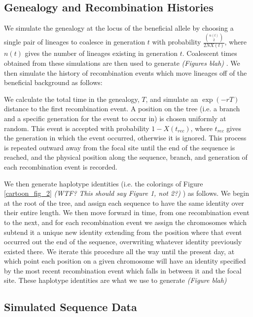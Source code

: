 \documentclass[a4paper,10pt]{article}
\newcommand{\jb}[1]{{\it\color{blue} (#1)} }
\begin{document}
\subsection*{Genealogy and Recombination Histories}

We simulate the genealogy at the locus of the beneficial allele by choosing a single pair of lineages to coalesce in generation $t$ with probability $\frac{{n\left(t\right) \choose 2}}{2NX\left(t\right)}$, where $n\left(t\right)$ gives the number of lineages existing in generation $t$. Coalescent times obtained from these simulations are then used to generate \jb{Figures blah}. We then simulate the history of recombination events which move lineages off of the beneficial background as follows:

We calculate the total time in the genealogy, $T$, and simulate an $\exp\left(-rT\right)$ distance to the first recombination event. A position on the tree (i.e. a branch and a specific generation for the event to occur in) is chosen uniformly at random. This event is accepted with probability $1-X\left(t_{rec}\right)$, where $t_{rec}$ gives the generation in which the event occurred, otherwise it is ignored. This process is repeated outward away from the focal site until the end of the sequence is reached, and the physical position along the sequence, branch, and generation of each recombination event is recorded.

We then generate haplotype identities (i.e. the colorings of Figure \ref{cartoon_fig_2} \jb{WTF? This should say Figure 1, not 2?}) as follows. We begin at the root of the tree, and assign each sequence to have the same identity over their entire length. We then move forward in time, from one recombination event to the next, and for each recombination event we assign the chromosomes which subtend it a unique new identity extending from the position where that event occurred out the end of the sequence, overwriting whatever identity previously existed there. We iterate this procedure all the way until the present day, at which point each position on a given chromosome will have an identity specified by the most recent recombination event which falls in between it and the focal site. These haplotype identities are what we use to generate \jb{Figure blah}

\subsection*{Simulated Sequence Data}
\end{document}
